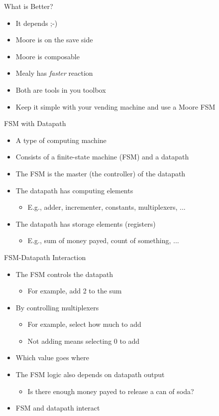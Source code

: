 \begin{frame}[fragile]{What is Better?}
\begin{itemize}
\item It depends ;-)
\item Moore is on the save side
\item Moore is composable
\item Mealy has \emph{faster} reaction
\item Both are tools in you toolbox
\item Keep it simple with your vending machine and use a Moore FSM
\end{itemize}
\end{frame}


\begin{frame}[fragile]{FSM with Datapath}
\begin{itemize}
\item A type of computing machine
\item Consists of a finite-state machine (FSM) and a datapath
\item The FSM is the master (the controller) of the datapath
\item The datapath has computing elements
\begin{itemize}
\item E.g., adder, incrementer, constants, multiplexers, ...
\end{itemize}
\item The datapath has storage elements (registers)
\begin{itemize}
\item E.g., sum of money payed, count of something, ...
\end{itemize}
\end{itemize}
\end{frame}

\begin{frame}[fragile]{FSM-Datapath Interaction}
\begin{itemize}
\item The FSM controls the datapath
\begin{itemize}
\item For example, add 2 to the sum
\end{itemize}
\item By controlling multiplexers
\begin{itemize}
\item For example, select how much to add
\item Not adding means selecting 0 to add
\end{itemize}
\item Which value goes where
\item The FSM logic also depends on datapath output
\begin{itemize}
\item Is there enough money payed to release a can of soda?
\end{itemize}
\item FSM and datapath interact
\end{itemize}
\end{frame}


